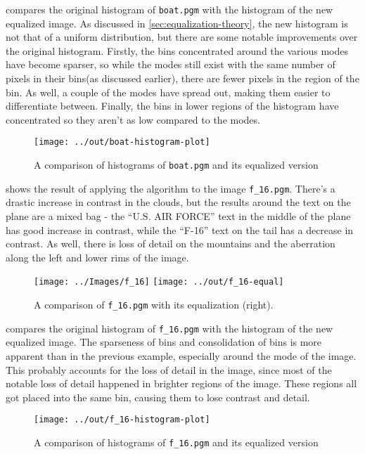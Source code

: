 \documentclass[headings=optiontoheadandtoc,listof=totoc]{scrartcl}
\begin{document}
 compares the original histogram of \texttt{boat.pgm} with the histogram of the new equalized image. As discussed in \cref{sec:equalization-theory}, the new histogram is not that of a uniform distribution, but there are some notable improvements over the original histogram. Firstly, the bins concentrated around the various modes have become sparser, so while the modes still exist with the same number of pixels in their bins(as discussed earlier), there are fewer pixels in the region of the bin. As well, a couple of the modes have spread out, making them easier to differentiate between. Finally, the bins in lower regions of the histogram have concentrated so they aren't as low compared to the modes.

\begin{figure}[ht]
	\centering\texttt{[image: ../out/boat-histogram-plot]}
	\caption{A comparison of histograms of \texttt{boat.pgm} and its equalized version}
	\label{fig:equal-histogram-1}
\end{figure}

 shows the result of applying the algorithm to the image \texttt{f\_16.pgm}. There's a drastic increase in contrast in the clouds, but the results around the text on the plane are a mixed bag - the ``U.S. AIR FORCE'' text in the middle of the plane has good increase in contrast, while the ``F-16'' text on the tail has a decrease in contrast. As well, there is loss of detail on the mountains and the aberration along the left and lower rims of the image.

\begin{figure}[ht]
	\centering
	\texttt{[image: ../Images/f\_16]}
	\texttt{[image: ../out/f\_16-equal]}
	\caption{A comparison of \texttt{f\_16.pgm} with its equalization (right).}
	\label{fig:equal-result-2}
\end{figure}

 compares the original histogram of \texttt{f\_16.pgm} with the histogram of the new equalized image. The sparseness of bins and consolidation of bins is more apparent than in the previous example, especially around the mode of the image. This probably accounts for the loss of detail in the image, since most of the notable loss of detail happened in brighter regions of the image. These regions all got placed into the same bin, causing them to lose contrast and detail.

\begin{figure}[ht]
	\centering\texttt{[image: ../out/f\_16-histogram-plot]}
	\caption{A comparison of histograms of \texttt{f\_16.pgm} and its equalized version}
	\label{fig:equal-histogram-2}
\end{figure}
\end{document}
